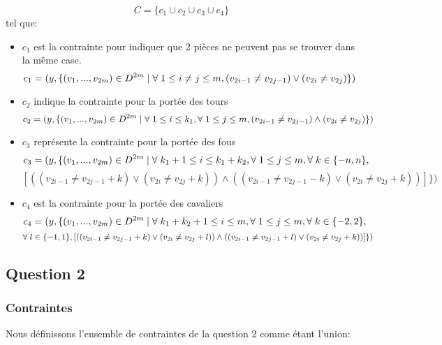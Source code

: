 \documentclass[a4paper,11pt]{article}
\begin{document}
$$C = \{c_{1} \cup c_{2} \cup c_{3} \cup c_{4}\} $$
tel que:
\begin{itemize}
\item $c_{1}$ est la contrainte pour indiquer que 2 pièces ne peuvent pas se trouver dans la même case.
   $$c_{1} = ( y, \{ (v_{1}, ..., v_{2m}) \in  D^{2m} \mid \forall \hspace{0.1cm}  1\leq i \neq j \leq m, (v_{2i-1} \neq v_{2j-1}) \vee  (v_{2i} \neq v_{2j}) \} ) $$
   
\item $c_{2}$ indique la contrainte pour la portée des tours 
 $$ c_{2} = ( y, \{ (v_{1}, ..., v_{2m}) \in  D^{2m} \mid \forall \hspace{0.1cm} 1\leq i \leq k_{1}, \forall \hspace{0.1cm} 1\leq j \leq m, (v_{2i-1} \neq v_{2j-1}) \wedge  (v_{2i} \neq v_{2j}) \} ) $$

\item $c_{3}$ représente la contrainte pour la portée des fous 
  $$c_{3} = ( y, \{ (v_{1}, ..., v_{2m}) \in  D^{2m} \mid \forall \hspace{0.1cm}  k_{1}+1\leq i \leq k_{1}+k_{2}, \forall \hspace{0.1cm} 1\leq j \leq m, \forall \hspace{0.1cm} k \in \{-n, n \}, $$
  $$[ ((v_{2i-1} \neq v_{2j-1}+k) \vee  (v_{2i} \neq v_{2j}+k)) \wedge  ((v_{2i-1} \neq v_{2j-1}-k) \vee  (v_{2i} \neq v_{2j}+k)) ] \})$$

\item $c_{4}$ est la contrainte pour la portée des cavaliers
  $$ c_{4} = ( y, \{ (v_{1}, ..., v_{2m}) \in  D^{2m} \mid \forall \hspace{0.1cm} k_{1}+k_{2}+1\leq i \leq m, \forall \hspace{0.1cm} 1\leq j \leq m, \forall \hspace{0.1cm} k \in \{-2, 2\},$$
  $$ \forall \hspace{0.1cm}l \in \{-1, 1\}, [((v_{2i-1} \neq v_{2j-1}+k) \vee  (v_{2i} \neq v_{2j}+l)) \wedge ((v_{2i-1} \neq v_{2j-1}+l) \vee  (v_{2i} \neq v_{2j}+k)) ] \})$$

\end{itemize}

\newpage 
\subsection{Question 2}

\subsubsection{Contraintes}
Nous définissons l’ensemble de contraintes de la question 2 comme étant l'union:
\end{document}
